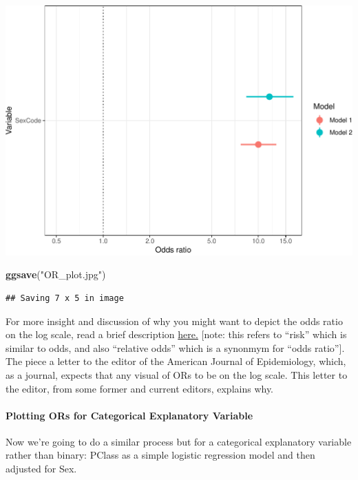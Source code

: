 \documentclass[]{article}
\newenvironment{Shaded}{\begin{snugshade}}{\end{snugshade}}
\newcommand{\KeywordTok}[1]{\textcolor[rgb]{0.13,0.29,0.53}{\textbf{#1}}}
\newcommand{\NormalTok}[1]{#1}
\newcommand{\StringTok}[1]{\textcolor[rgb]{0.31,0.60,0.02}{#1}}
\let\oldparagraph\paragraph
\renewcommand{\paragraph}[1]{\oldparagraph{#1}\mbox{}}
\begin{document}
\includegraphics{Visualization_Examples_2020_v01_files/figure-latex/unnamed-chunk-9-1.pdf}

\begin{Shaded}
\begin{Highlighting}[]
\KeywordTok{ggsave}\NormalTok{(}\StringTok{"OR_plot.jpg"}\NormalTok{)}
\end{Highlighting}
\end{Shaded}

\begin{verbatim}
## Saving 7 x 5 in image
\end{verbatim}

For more insight and discussion of why you might want to depict the odds
ratio on the log scale, read a brief description
\href{https://academic.oup.com/aje/article/174/3/376/247288}{here.}
{[}note: this refers to ``risk'' which is similar to odds, and also
``relative odds'' which is a synonmym for ``odds ratio''{]}. The piece a
letter to the editor of the American Journal of Epidemiology, which, as
a journal, expects that any visual of ORs to be on the log scale. This
letter to the editor, from some former and current editors, explains
why.

\hypertarget{plotting-ors-for-categorical-explanatory-variable}{%
\paragraph{Plotting ORs for Categorical Explanatory
Variable}\label{plotting-ors-for-categorical-explanatory-variable}}

Now we're going to do a similar process but for a categorical
explanatory variable rather than binary: PClass as a simple logistic
regression model and then adjusted for Sex.
\end{document}
